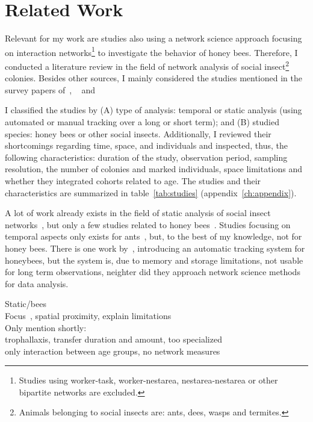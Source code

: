 \chapter{Related Work}
\label{ch:relatedwork}

Relevant for my work are studies also using a network science approach focusing on interaction networks\footnote{Studies using worker-task, worker-nestarea, nestarea-nestarea or other bipartite networks are excluded.} to investigate the behavior of honey bees.
Therefore, I conducted a literature review in the field of network analysis of social insect\footnote{Animals belonging to social insects are: ants, dees, wasps and termites.} colonies.
Besides other sources, I mainly considered the studies mentioned in the survey papers of~\textcite{Pinter-Wollman2014}, ~\textcite[chapter~15]{krause2014animal} and~\textcite{charbonneau2013social}

I classified the studies by (A) type of analysis: temporal or static analysis (using automated or manual tracking over a long or short term); and (B) studied species: honey bees or other social insects.
Additionally, I reviewed their shortcomings regarding time, space, and individuals and inspected, thus, the following characteristics: duration of the study, observation period, sampling resolution, the number of colonies and marked individuals, space limitations and whether they integrated cohorts related to age. The studies and their characteristics are summarized in table~\ref{tab:studies} (appendix~\ref{ch:appendix}).

A lot of work already exists in the field of static analysis of social insect networks~\cite{greenwald2015ant,pinter2011effect,otterstatter2007contact,quevillon2015social,naug2009structure,formica2012fitness,waters2012information}, but only a few studies related to honey bees~\cite{baracchi2014socio,naug2008structure,scholl2011olfactory}.
Studies focusing on temporal aspects only exists for ants~\cite{mersch2013tracking,blonder2011time,jeanson2012long}, but, to the best of my knowledge, not for honey bees.
There is one work by~\cite{kimura2011new}, introducing an automatic tracking system for honeybees, but the system is, due to memory and storage limitations, not usable for long term observations, neighter did they approach network science methods for data analysis.

Static/bees\\
Focus~\textcite{baracchi2014socio}, spatial proximity, explain limitations\\
Only mention shortly:\\
\textcite{naug2008structure} trophallaxis, transfer duration and amount, too specialized\\
\textcite{scholl2011olfactory} only interaction between age groups, no network measures\\

